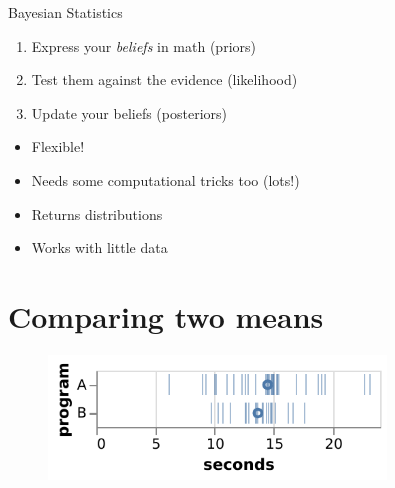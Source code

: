\documentclass[aspectratio=169,xcolor=svgnames]{beamer}
\begin{document}
\begin{frame}
  \begin{block}{Bayesian Statistics}
    \begin{enumerate}
    \item Express your \emph{beliefs} in math (priors)
    \item Test them against the evidence (likelihood)
    \item Update your beliefs (posteriors)
    \end{enumerate}
  \end{block}

\end{frame}

\begin{frame}
  \begin{itemize}
  \item Flexible!
  \item Needs some computational tricks too (lots!)
  \item Returns distributions
  \item Works with little data
  \end{itemize}
\end{frame}

\section{Comparing two means}

\begin{frame}
  \begin{figure}[ht]
    \centering
    \includegraphics[width=0.8\textwidth]{figures/samples_a_b.pdf}
  \end{figure}
\end{frame}

\newcommand{\parameter}[1]{\textcolor{orange}{#1}}
\newcommand{\observed}[1]{\textcolor{cyan}{#1}}
\end{document}
